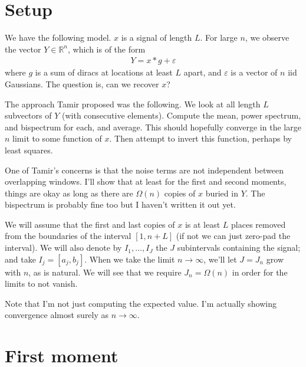 \documentclass{article}
\theoremstyle{thm}
\theoremstyle{definition}
\newcommand{\ep}{\varepsilon}
\begin{document}
\section{Setup}

We have the following model. $x$ is a signal of length $L$. For large $n$, we observe the vector $Y \in \mathbb{R}^n$, which is of the form 
%
\begin{align}
%
    Y = x \ast g + \ep
%
\end{align}
%
where $g$ is a sum of diracs at locations at least $L$ apart, and $\ep$ is a vector of $n$ iid Gaussians. The question is, can we recover $x$? 

The approach Tamir proposed was the following. We look at all length $L$ subvectors of $Y$ (with consecutive elements). Compute the mean, power spectrum, and bispectrum for each, and average. This should hopefully converge in the large $n$ limit to some function of $x$. Then attempt to invert this function, perhaps by least squares.

One of Tamir's concerns is that the noise terms are not independent between overlapping windows. I'll show that at least for the first and second moments, things are okay as long as there are $\Omega(n)$ copies of $x$ buried in $Y$. The bispectrum is probably fine too but I haven't written it out yet.


We will assume that the first and last copies of $x$ is at least $L$ places removed from the boundaries of the interval $[1,n + L]$ (if not we can just zero-pad the interval). We will also denote by $I_1,\dots,I_J$ the $J$ subintervals containing the signal; and take $I_j = [a_j,b_j]$. When we take the limit $n \to \infty$, we'll let $J = J_n$ grow with $n$, as is natural. We will see that we require $J_n = \Omega(n)$ in order for the limits to not vanish.

Note that I'm not just computing the expected value. I'm actually showing convergence almost surely as $n \to \infty$.



\section{First moment}
\end{document}

